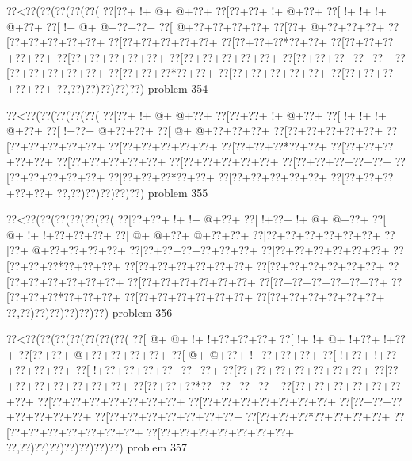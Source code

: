 \vbox{\vbox{\goo
\0??<\0??(\0??(\0??(\0??(\0??(
\0??[\0??+\- !+\- @+\- @+\0??+
\0??[\0??+\0??+\- !+\- @+\0??+
\0??[\- !+\- !+\- !+\- @+\0??+
\0??[\- !+\- @+\- @+\0??+\0??+
\0??[\- @+\0??+\0??+\0??+\0??+
\0??[\0??+\- @+\0??+\0??+\0??+
\0??[\0??+\0??+\0??+\0??+\0??+
\0??[\0??+\0??+\0??+\0??+\0??+
\0??[\0??+\0??+\0??*\0??+\0??+
\0??[\0??+\0??+\0??+\0??+\0??+
\0??[\0??+\0??+\0??+\0??+\0??+
\0??[\0??+\0??+\0??+\0??+\0??+
\0??[\0??+\0??+\0??+\0??+\0??+
\0??[\0??+\0??+\0??+\0??+\0??+
\0??[\0??+\0??+\0??*\0??+\0??+
\0??[\0??+\0??+\0??+\0??+\0??+
\0??[\0??+\0??+\0??+\0??+\0??+
\0??,\0??)\0??)\0??)\0??)\0??)
}
\hfil problem 354\hfil\break
}

\vbox{\vbox{\goo
\0??<\0??(\0??(\0??(\0??(\0??(
\0??[\0??+\- !+\- @+\- @+\0??+
\0??[\0??+\0??+\- !+\- @+\0??+
\0??[\- !+\- !+\- !+\- @+\0??+
\0??[\- !+\0??+\- @+\0??+\0??+
\0??[\- @+\- @+\0??+\0??+\0??+
\0??[\0??+\0??+\0??+\0??+\0??+
\0??[\0??+\0??+\0??+\0??+\0??+
\0??[\0??+\0??+\0??+\0??+\0??+
\0??[\0??+\0??+\0??*\0??+\0??+
\0??[\0??+\0??+\0??+\0??+\0??+
\0??[\0??+\0??+\0??+\0??+\0??+
\0??[\0??+\0??+\0??+\0??+\0??+
\0??[\0??+\0??+\0??+\0??+\0??+
\0??[\0??+\0??+\0??+\0??+\0??+
\0??[\0??+\0??+\0??*\0??+\0??+
\0??[\0??+\0??+\0??+\0??+\0??+
\0??[\0??+\0??+\0??+\0??+\0??+
\0??,\0??)\0??)\0??)\0??)\0??)
}
\hfil problem 355\hfil\break
}

\vbox{\vbox{\goo
\0??<\0??(\0??(\0??(\0??(\0??(\0??(
\0??[\0??+\0??+\- !+\- !+\- @+\0??+
\0??[\- !+\0??+\- !+\- @+\- @+\0??+
\0??[\- @+\- !+\- !+\0??+\0??+\0??+
\0??[\- @+\- @+\0??+\- @+\0??+\0??+
\0??[\0??+\0??+\0??+\0??+\0??+\0??+
\0??[\0??+\- @+\0??+\0??+\0??+\0??+
\0??[\0??+\0??+\0??+\0??+\0??+\0??+
\0??[\0??+\0??+\0??+\0??+\0??+\0??+
\0??[\0??+\0??+\0??*\0??+\0??+\0??+
\0??[\0??+\0??+\0??+\0??+\0??+\0??+
\0??[\0??+\0??+\0??+\0??+\0??+\0??+
\0??[\0??+\0??+\0??+\0??+\0??+\0??+
\0??[\0??+\0??+\0??+\0??+\0??+\0??+
\0??[\0??+\0??+\0??+\0??+\0??+\0??+
\0??[\0??+\0??+\0??*\0??+\0??+\0??+
\0??[\0??+\0??+\0??+\0??+\0??+\0??+
\0??[\0??+\0??+\0??+\0??+\0??+\0??+
\0??,\0??)\0??)\0??)\0??)\0??)\0??)
}
\hfil problem 356\hfil\break
}

\vbox{\vbox{\goo
\0??<\0??(\0??(\0??(\0??(\0??(\0??(\0??(
\0??[\- @+\- @+\- !+\- !+\0??+\0??+\0??+
\0??[\- !+\- !+\- @+\- !+\0??+\- !+\0??+
\0??[\0??+\0??+\- @+\0??+\0??+\0??+\0??+
\0??[\- @+\- @+\0??+\- !+\0??+\0??+\0??+
\0??[\- !+\0??+\- !+\0??+\0??+\0??+\0??+
\0??[\- !+\0??+\0??+\0??+\0??+\0??+\0??+
\0??[\0??+\0??+\0??+\0??+\0??+\0??+\0??+
\0??[\0??+\0??+\0??+\0??+\0??+\0??+\0??+
\0??[\0??+\0??+\0??*\0??+\0??+\0??+\0??+
\0??[\0??+\0??+\0??+\0??+\0??+\0??+\0??+
\0??[\0??+\0??+\0??+\0??+\0??+\0??+\0??+
\0??[\0??+\0??+\0??+\0??+\0??+\0??+\0??+
\0??[\0??+\0??+\0??+\0??+\0??+\0??+\0??+
\0??[\0??+\0??+\0??+\0??+\0??+\0??+\0??+
\0??[\0??+\0??+\0??*\0??+\0??+\0??+\0??+
\0??[\0??+\0??+\0??+\0??+\0??+\0??+\0??+
\0??[\0??+\0??+\0??+\0??+\0??+\0??+\0??+
\0??,\0??)\0??)\0??)\0??)\0??)\0??)\0??)
}
\hfil problem 357\hfil\break
}

